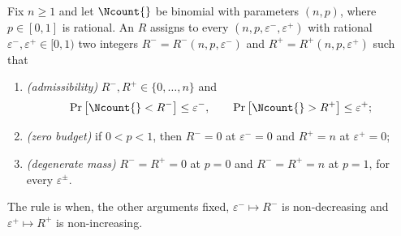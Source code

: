\begin{definition}\label{def:endpoint-rule}
Fix $n\ge1$ and let $\Ncount{}$ be binomial with parameters $(n,p)$, where
$p\in[0,1]$ is rational. An  $R$ assigns to every
$(n,p,\varepsilon^{-},\varepsilon^{+})$ with rational
$\varepsilon^{-},\varepsilon^{+}\in[0,1)$ two integers
$R^{-}=R^{-}(n,p,\varepsilon^{-})$ and $R^{+}=R^{+}(n,p,\varepsilon^{+})$
such that
\begin{enumerate}[label=(\alph*),leftmargin=2.2em]
\item \emph{(admissibility)} $R^{-},R^{+}\in\{0,\dots,n\}$ and
\begin{equation}\label{eq:rule-admissible}
  \Pr\big[\Ncount{}<R^{-}\big]\le\varepsilon^{-},
  \qquad
  \Pr\big[\Ncount{}>R^{+}\big]\le\varepsilon^{+};
\end{equation}
\item \emph{(zero budget)} if $0<p<1$, then $R^{-}=0$ at $\varepsilon^{-}=0$
and $R^{+}=n$ at $\varepsilon^{+}=0$;
\item \emph{(degenerate mass)} $R^{-}=R^{+}=0$ at $p=0$ and $R^{-}=R^{+}=n$
at $p=1$, for every $\varepsilon^{\pm}$.
\end{enumerate}
The rule is  when, the other arguments fixed,
$\varepsilon^{-}\mapsto R^{-}$ is non-decreasing and
$\varepsilon^{+}\mapsto R^{+}$ is non-increasing.


\end{definition}
